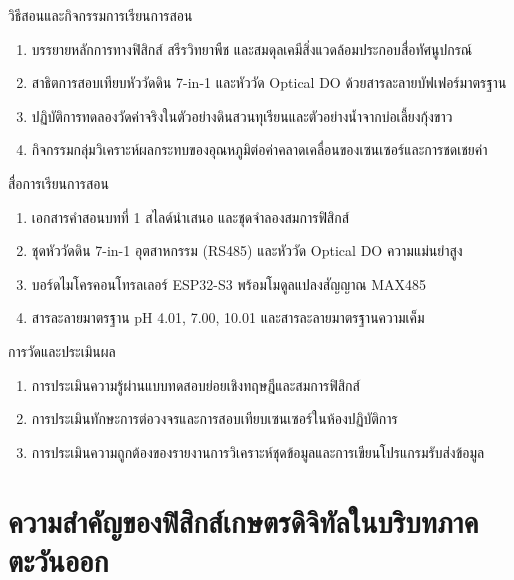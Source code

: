 \newpage

\begin{planbox}{วิธีสอนและกิจกรรมการเรียนการสอน}
\begin{enumerate}[topsep=2pt, itemsep=1pt, partopsep=0pt, parsep=0pt, leftmargin=1.5em]
    \item บรรยายหลักการทางฟิสิกส์ สรีรวิทยาพืช และสมดุลเคมีสิ่งแวดล้อมประกอบสื่อทัศนูปกรณ์
    \item สาธิตการสอบเทียบหัววัดดิน 7-in-1 และหัววัด Optical DO ด้วยสารละลายบัฟเฟอร์มาตรฐาน
    \item ปฏิบัติการทดลองวัดค่าจริงในตัวอย่างดินสวนทุเรียนและตัวอย่างน้ำจากบ่อเลี้ยงกุ้งขาว
    \item กิจกรรมกลุ่มวิเคราะห์ผลกระทบของอุณหภูมิต่อค่าคลาดเคลื่อนของเซนเซอร์และการชดเชยค่า
\end{enumerate}
\end{planbox}

\begin{planbox}{สื่อการเรียนการสอน}
\begin{enumerate}[topsep=2pt, itemsep=1pt, partopsep=0pt, parsep=0pt, leftmargin=1.5em]
    \item เอกสารคำสอนบทที่ 1 สไลด์นำเสนอ และชุดจำลองสมการฟิสิกส์
    \item ชุดหัววัดดิน 7-in-1 อุตสาหกรรม (RS485) และหัววัด Optical DO ความแม่นยำสูง
    \item บอร์ดไมโครคอนโทรลเลอร์ ESP32-S3 พร้อมโมดูลแปลงสัญญาณ MAX485
    \item สารละลายมาตรฐาน pH 4.01, 7.00, 10.01 และสารละลายมาตรฐานความเค็ม
\end{enumerate}
\end{planbox}

\begin{planbox}{การวัดและประเมินผล}
\begin{enumerate}[topsep=2pt, itemsep=1pt, partopsep=0pt, parsep=0pt, leftmargin=1.5em]
    \item การประเมินความรู้ผ่านแบบทดสอบย่อยเชิงทฤษฎีและสมการฟิสิกส์
    \item การประเมินทักษะการต่อวงจรและการสอบเทียบเซนเซอร์ในห้องปฏิบัติการ
    \item การประเมินความถูกต้องของรายงานการวิเคราะห์ชุดข้อมูลและการเขียนโปรแกรมรับส่งข้อมูล
\end{enumerate}
\end{planbox}

\clearpage

\section{ความสำคัญของฟิสิกส์เกษตรดิจิทัลในบริบทภาคตะวันออก}


